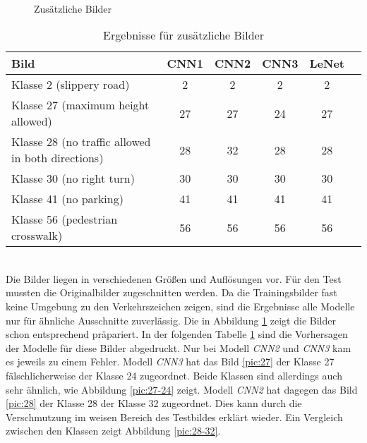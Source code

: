 \begin{figure} [!ht]
	\centering
	\\
	\caption{Zusätzliche Bilder} \label{pic:new-pics}
\end{figure} 
%
\begin{table}[ht]
	\begin{tabular}{|l|cccc|c|}
		\hline
		Bild & CNN1 & CNN2 & CNN3 & LeNet\\\hline
		Klasse 2  (slippery road) & 2 & 2 & 2 & 2\\
		Klasse 27 (maximum height allowed) & 27 & 27 & 24 & 27\\
		Klasse 28 (no traffic allowed in both directions) & 28 & 32 & 28 & 28\\
		Klasse 30 (no right turn) & 30 & 30 & 30 & 30\\
		Klasse 41 (no parking) & 41 & 41 & 41 & 41\\
		Klasse 56 (pedestrian crosswalk) & 56 & 56 & 56 & 56\\
		\hline
	\end{tabular}
	\caption{Ergebnisse für zusätzliche Bilder}
	\label{tab:ergebnisse-add}
\end{table} \ \\
Die Bilder liegen in verschiedenen Größen und Auflösungen vor. 
Für den Test mussten die Originalbilder zugeschnitten werden. Da die Trainingsbilder fast keine Umgebung zu den Verkehrszeichen zeigen, sind die Ergebnisse alle Modelle nur für ähnliche Ausschnitte zuverlässig. Die in Abbildung \ref{pic:new-pics} zeigt die Bilder schon entsprechend präpariert. 
In der folgenden Tabelle \ref{tab:ergebnisse-add} sind die Vorhersagen der Modelle für diese Bilder abgedruckt. Nur bei Modell \textit{CNN2} und \textit{CNN3} kam es jeweils zu einem Fehler. Modell \textit{CNN3} hat das Bild \ref{pic:27} der Klasse 27 fälschlicherweise der Klasse 24 zugeordnet. Beide Klassen sind allerdings auch sehr ähnlich, wie Abbildung \ref{pic:27-24} zeigt.
Modell \textit{CNN2} hat dagegen das Bild \ref{pic:28} der Klasse 28 der Klasse 32 zugeordnet. Dies kann durch die Verschmutzung im weisen Bereich des Testbildes erklärt wieder. Ein Vergleich zwischen den Klassen zeigt Abbildung \ref{pic:28-32}.

